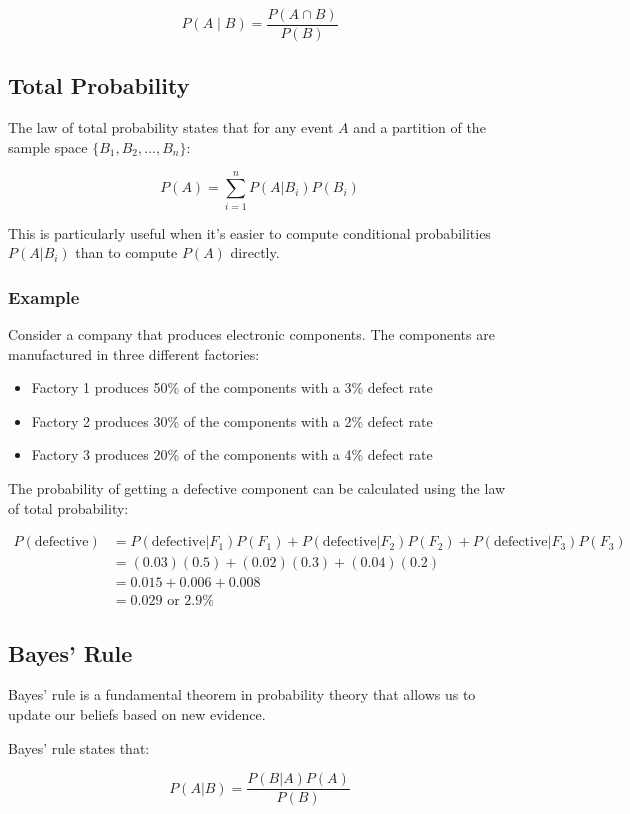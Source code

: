 \documentclass{article}
\begin{document}
$$
P(A \mid B) = \frac{P(A \cap B)}{P(B)}
$$


\subsection*{Total Probability}

The law of total probability states that for any event $A$ and a partition of the sample space $\{B_1, B_2, ..., B_n\}$:

$$
P(A) = \sum_{i=1}^n P(A|B_i)P(B_i)
$$

This is particularly useful when it's easier to compute conditional probabilities $P(A|B_i)$ than to compute $P(A)$ directly.

\subsubsection*{Example}
Consider a company that produces electronic components. The components are manufactured in three different factories:
\begin{itemize}
    \item Factory 1 produces 50\% of the components with a 3\% defect rate
    \item Factory 2 produces 30\% of the components with a 2\% defect rate
    \item Factory 3 produces 20\% of the components with a 4\% defect rate
\end{itemize}

The probability of getting a defective component can be calculated using the law of total probability:

\begin{align*}
P(\text{defective}) &= P(\text{defective}|F_1)P(F_1) + P(\text{defective}|F_2)P(F_2) + P(\text{defective}|F_3)P(F_3) \\
&= (0.03)(0.5) + (0.02)(0.3) + (0.04)(0.2) \\
&= 0.015 + 0.006 + 0.008 \\
&= 0.029 \text{ or } 2.9\%
\end{align*}

\subsection*{Bayes' Rule}
Bayes' rule is a fundamental theorem in probability theory that allows us to update our beliefs based on new evidence.

Bayes' rule states that:

$$
P(A|B) = \frac{P(B|A)P(A)}{P(B)}
$$
\end{document}
